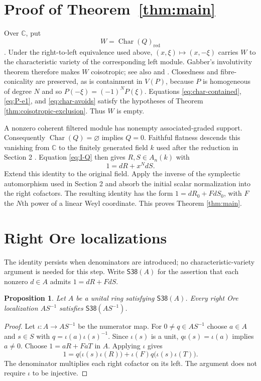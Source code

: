 \documentclass[11pt]{amsart}
\newtheorem{proposition}[theorem]{Proposition}
\theoremstyle{definition}
\newcommand{\CharVar}{\operatorname{Char}}
\begin{document}
\section{Proof of Theorem~\ref{thm:main}}

Over $\mathbb C$, put
\[
 W=\CharVar(Q)_{\mathrm{red}}
\].
Under the right-to-left equivalence used above, $(x,\xi)\mapsto(x,-\xi)$
carries $W$ to the characteristic variety of the corresponding left module.
Gabber's involutivity theorem \cite{Gabber1981,Gabber1982} therefore makes
$W$ coisotropic; see also \cite[Theorem~2.3.1 and Appendix D]{HTT} and
\cite{SinghKumar2014}. Closedness and fibre-conicality are preserved, as is
containment in $V(P)$, because $P$ is homogeneous of degree $N$ and so
$P(-\xi)=(-1)^NP(\xi)$. Equations
\eqref{eq:char-contained}, \eqref{eq:P-e1}, and \eqref{eq:char-avoids}
satisfy the hypotheses of Theorem \ref{thm:coisotropic-exclusion}. Thus $W$ is
empty.

A nonzero coherent filtered module has nonempty associated-graded support.
Consequently $\CharVar(Q)=\varnothing$ implies $Q=0$. Faithful flatness descends
this vanishing from $\mathbb C$ to the finitely generated field $k$ used after
the reduction in Section 2 \cite[Tag 00HP]{Stacks}. Equation \eqref{eq:I-Q}
then gives $R,S\in A_n(k)$ with
\[
 1=dR+x^NdS.
\]
Extend this identity to the original field. Apply the inverse of the
symplectic automorphism used in Section 2 and absorb the initial scalar
normalization into the right cofactors. The resulting identity has the form
$1=dR_0+FdS_0$, with $F$ the $N$th power of a linear Weyl coordinate.
This proves Theorem \ref{thm:main}.


\section{Right Ore localizations}\label{sec:ore-localization}

The identity persists when denominators are introduced; no characteristic-variety
argument is needed for this step. Write $\mathsf{S38}(A)$ for the assertion that
each nonzero $d\in A$ admits $1=dR+FdS$.

\begin{proposition}\label{prop:ore-localization}
Let $A$ be a unital ring satisfying $\mathsf{S38}(A)$. Every right Ore
localization $AS^{-1}$ satisfies $\mathsf{S38}(AS^{-1})$.
\end{proposition}
\begin{proof}
Let $\iota:A\to AS^{-1}$ be the numerator map. For $0\ne q\in AS^{-1}$ choose
$a\in A$ and $s\in S$ with $q=\iota(a)\iota(s)^{-1}$.
Since $\iota(s)$ is a unit, $q\iota(s)=\iota(a)$ implies $a\ne0$.
Choose $1=aR+FaT$ in $A$. Applying $\iota$ gives
\[
 1=q\bigl(\iota(s)\iota(R)\bigr)
   +\iota(F)q\bigl(\iota(s)\iota(T)\bigr).
\]
The denominator multiplies each right cofactor on its left.
The argument does not require $\iota$ to be injective.
\end{proof}
\end{document}
